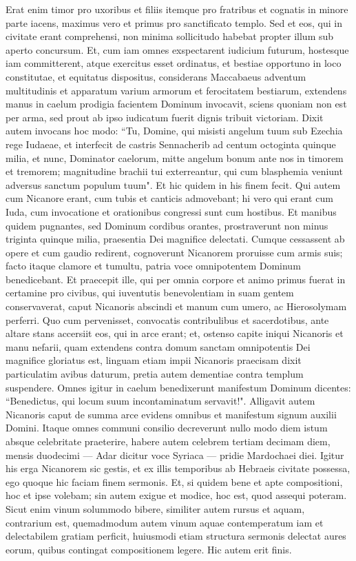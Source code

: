 \begin{biblechapter}
\verse Erat enim timor pro uxoribus et filiis itemque pro fratribus et cognatis in minore parte iacens, maximus vero et primus pro sanctificato templo. 
\verse Sed et eos, qui in civitate erant comprehensi, non minima sollicitudo habebat propter illum sub aperto concursum. 
\verse Et, cum iam omnes exspectarent iudicium futurum, hostesque iam committerent, atque exercitus esset ordinatus, et bestiae opportuno in loco constitutae, et equitatus dispositus, 
\verse considerans Maccabaeus adventum multitudinis et apparatum varium armorum et ferocitatem bestiarum, extendens manus in caelum prodigia facientem Dominum invocavit, sciens quoniam non est per arma, sed prout ab ipso iudicatum fuerit dignis tribuit victoriam. 
\verse Dixit autem invocans hoc modo: “Tu, Domine, qui misisti angelum tuum sub Ezechia rege Iudaeae, et interfecit de castris Sennacherib ad centum octoginta quinque milia,  
\verse et nunc, Dominator caelorum, mitte angelum bonum ante nos in timorem et tremorem; 
\verse magnitudine brachii tui exterreantur, qui cum blasphemia veniunt adversus sanctum populum tuum". Et hic quidem in his finem fecit. 
\verse Qui autem cum Nicanore erant, cum tubis et canticis admovebant; 
\verse hi vero qui erant cum Iuda, cum invocatione et orationibus congressi sunt cum hostibus. 
\verse Et manibus quidem pugnantes, sed Dominum cordibus orantes, prostraverunt non minus triginta quinque milia, praesentia Dei magnifice delectati. 
\verse Cumque cessassent ab opere et cum gaudio redirent, cognoverunt Nicanorem proruisse cum armis suis; 
\verse facto itaque clamore et tumultu, patria voce omnipotentem Dominum benedicebant. 
\verse Et praecepit ille, qui per omnia corpore et animo primus fuerat in certamine pro civibus, qui iuventutis benevolentiam in suam gentem conservaverat, caput Nicanoris abscindi et manum cum umero, ac Hierosolymam perferri. 
\verse Quo cum pervenisset, convocatis contribulibus et sacerdotibus, ante altare stans accersiit eos, qui in arce erant; 
\verse et, ostenso capite iniqui Nicanoris et manu nefarii, quam extendens contra domum sanctam omnipotentis Dei magnifice gloriatus est, 
\verse linguam etiam impii Nicanoris praecisam dixit particulatim avibus daturum, pretia autem dementiae contra templum suspendere. 
\verse Omnes igitur in caelum benedixerunt manifestum Dominum dicentes: “Benedictus, qui locum suum incontaminatum servavit!". 
\verse Alligavit autem Nicanoris caput de summa arce evidens omnibus et manifestum signum auxilii Domini. 
\verse Itaque omnes communi consilio decreverunt nullo modo diem istum absque celebritate praeterire, habere autem celebrem tertiam decimam diem, mensis duodecimi — Adar dicitur voce Syriaca — pridie Mardochaei diei. 
\verse Igitur his erga Nicanorem sic gestis, et ex illis temporibus ab Hebraeis civitate possessa, ego quoque hic faciam finem sermonis. 
\verse Et, si quidem bene et apte compositioni, hoc et ipse volebam; sin autem exigue et modice, hoc est, quod assequi poteram. 
\verse Sicut enim vinum solummodo bibere, similiter autem rursus et aquam, contrarium est, quemadmodum autem vinum aquae contemperatum iam et delectabilem gratiam perficit, huiusmodi etiam structura sermonis delectat aures eorum, quibus contingat compositionem legere. Hic autem erit finis.
\end{biblechapter}
